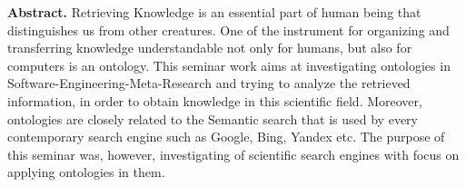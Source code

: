 
\textbf{Abstract.} Retrieving Knowledge is an essential part of human being that distinguishes us from other creatures. One of the instrument for organizing and transferring knowledge understandable not only for humans, but also for computers is an ontology. This seminar work aims at investigating ontologies in Software-Engineering-Meta-Research and trying to analyze the retrieved information, in order to obtain knowledge in this scientific field. Moreover, ontologies are closely related to the Semantic search that is used by every contemporary search engine such as Google, Bing, Yandex etc. The purpose of this seminar was, however, investigating of scientific search engines with focus on applying ontologies in them.        